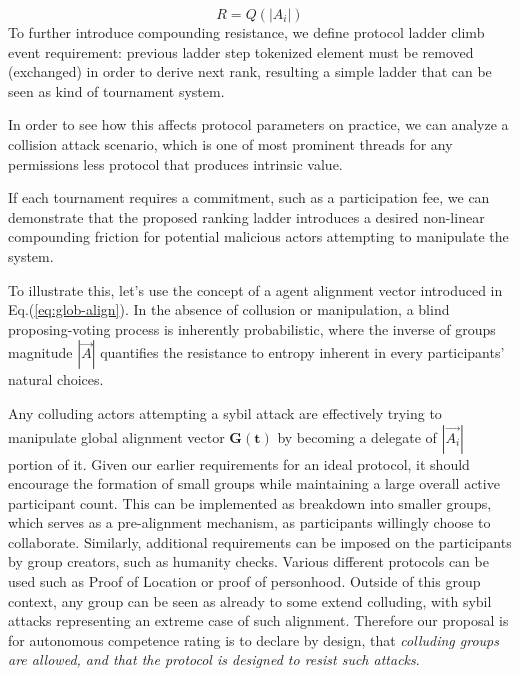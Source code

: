 \documentclass{article}
\begin{document}
\begin{CJK}{UTF8}{gbsn}
\begin{multicols}{2}
        \begin{equation}
            \label{eq:comp-quant}
            R = Q(|A_i|)
        \end{equation}
        To further introduce compounding resistance, we define protocol ladder climb event requirement: previous ladder step tokenized element must be removed (exchanged) in order to derive next rank, resulting a simple ladder that can be seen as kind of tournament system.


        In order to see how this affects protocol parameters on practice, we can analyze a collision attack scenario, which is one of most prominent threads for any permissions less protocol that produces intrinsic value.


        If each tournament requires a commitment, such as a participation fee, we can demonstrate that the proposed ranking ladder introduces a desired non-linear compounding friction for potential malicious actors attempting to manipulate the system.

        To illustrate this, let's use the concept of a agent alignment vector introduced in Eq.(\ref*{eq:glob-align}). In the absence of collusion or manipulation, a blind proposing-voting process is inherently probabilistic, where the inverse of groups magnitude $|\vec{A}|$ quantifies the resistance to entropy inherent in every participants' natural choices.


        Any colluding actors attempting a sybil attack are effectively trying to manipulate global alignment vector $\mathbf{G(t)}$ by becoming a delegate of $|\vec{A_i}|$ portion of it. Given our earlier requirements for an ideal protocol, it should encourage the formation of small groups while maintaining a large overall active participant count. This can be implemented as breakdown into smaller groups, which serves as a pre-alignment mechanism, as participants willingly choose to collaborate. Similarly, additional requirements can be imposed on the participants by group creators, such as humanity checks. Various different protocols can be used such as Proof of Location\cite{sheng2024bftpolocbyzantinefortifiedtrigonometric} or  proof of personhood\cite{WorldCoin2024}. Outside of this group context, any group can be seen as already to some extend colluding, with sybil attacks representing an extreme case of such alignment. Therefore our proposal is for autonomous competence rating is to declare by design, that \textit{colluding groups are allowed, and that the protocol is designed to resist such attacks}.


\end{multicols}
\end{CJK}
\end{document}
